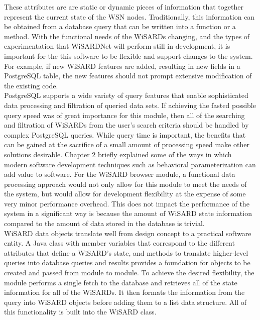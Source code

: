 These attributes are are static or dynamic pieces of information that together represent the current state of the WSN nodes. Traditionally, this information can be obtained from a database query that can be written into a function or a method. With the functional needs of the WiSARDs changing, and the types of experimentation that WiSARDNet will perform still in development, it is important for the this software to be flexible and support changes to the system. For example, if new WiSARD features are added, resulting in new fields in a PostgreSQL table, the new features should not prompt extensive modification of the existing code.\\

PostgreSQL supports a wide variety of query features that enable sophisticated data processing and filtration of queried data sets. If achieving the fasted possible query speed was of great importance for this module, then all of the searching and filtration of WiSARDs from the user's search criteria should be handled by complex PostgreSQL queries. While query time is important, the benefits that can be gained at the sacrifice of a small amount of processing speed make other solutions desirable. Chapter 2 briefly explained some of the ways in which modern software development techniques such as behavioral parameterization can add value to software. For the WiSARD browser module, a functional data processing approach would not only allow for this module to meet the needs of the system, but would allow for development flexibility at the expense of some very minor performance overhead. This does not impact the performance of the system in a significant way is because the amount of WiSARD state information compared to the amount of data stored in the database is trivial.\\

WiSARD data objects translate well from design concept to a practical software entity. A Java class with member variables that correspond to the different attributes that define a WiSARD's state, and methods to translate higher-level queries into database queries and results provides a foundation for objects to be created and passed from module to module. To achieve the desired flexibility, the module performs a single fetch to the database and retrieves all of the state information for all of the WiSARDs. It then formats the information from the query into WiSARD objects before adding them to a list data structure. All of this functionality is built into the WiSARD class.\\

